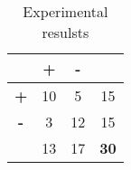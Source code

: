 \begin{table}
  \center
  \begin{tabular}{c|cc|c}
    & \textbf{+} & \textbf{-} & \\ \hline
    \textbf{+} & 10 & 5 & 15 \\
    \textbf{-} & 3 & 12 & 15 \\ \hline
    & 13 & 17 & \textbf{30} \\
  \end{tabular}
  \caption{Experimental resulsts}\label{tbl:results}
\end{table}
